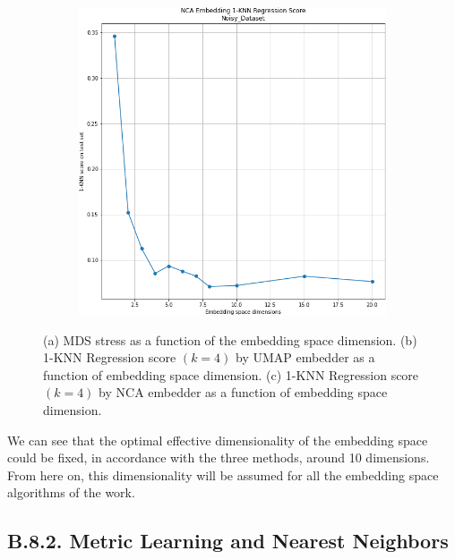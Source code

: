\documentclass[11pt, a4paper, twoside]{article} %
\begin{document}
\begin{figure}[h!]
\begin{subfigure}[b]{0.325\linewidth}
     \end{subfigure}
 \begin{subfigure}[b]{0.325\linewidth}
     \includegraphics[width=\linewidth]{dim2.png}
     \end{subfigure}
    \caption{(a) MDS stress as a function of the embedding space dimension. (b)  1-KNN Regression score $(k=4)$ by UMAP embedder as a function of embedding space dimension. (c)  1-KNN Regression score $(k=4)$ by NCA embedder as a function of embedding space dimension. }
        \label{fig:dimension}
\end{figure}

We can see that the optimal effective dimensionality of the embedding space could be fixed, in accordance with the three methods, around 10 dimensions. From here on, this dimensionality will be assumed for all the embedding space algorithms of the work.

\subsection*{B.8.2. Metric Learning and Nearest Neighbors}
\end{document}
